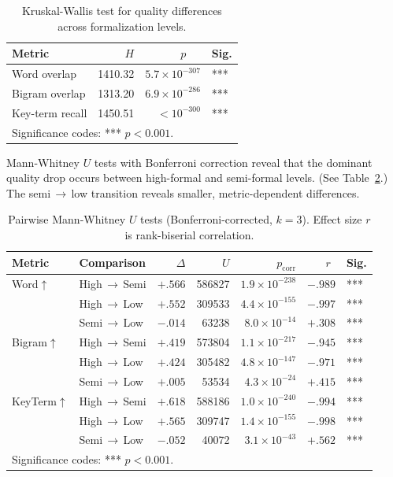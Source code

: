\documentclass[runningheads]{llncs}
\begin{document}
\begin{table}[htbp]
\centering
\caption{Kruskal-Wallis test for quality differences across formalization levels.}
\label{tab:kruskal}
\setlength{\tabcolsep}{5pt}
\begin{tabular}{lrrl}
\toprule
Metric & $H$ & $p~~~~~~$ & Sig. \\
\midrule
Word overlap    & 1410.32 & $5.7 \times 10^{-307}$ & *** \\
Bigram overlap  & 1313.20 & $6.9 \times 10^{-286}$ & *** \\
Key-term recall & 1450.51 & $< 10^{-300}$ & *** \\
\bottomrule
\multicolumn{4}{l}{\scriptsize Significance codes: *** $p < 0.001$.}
\end{tabular}
\end{table}

Mann-Whitney $U$ tests with Bonferroni correction reveal that the dominant quality drop occurs between high-formal and semi-formal levels. (See Table~\ref{tab:pairwise}.) The semi$\,\to\,$low transition reveals smaller, metric-dependent differences.

\begin{table}[htbp]
\centering
\caption{Pairwise Mann-Whitney $U$ tests (Bonferroni-corrected, $k\!=\!3$). Effect size $r$ is rank-biserial correlation.}
\label{tab:pairwise}
\setlength{\tabcolsep}{5pt}
\begin{tabular}{llrrrrl}
\toprule
Metric & Comparison & $\Delta$ & $U$ & $p_{\text{corr}}$ & $r~~$ & Sig. \\
\midrule
Word$\uparrow$
  & High$\,\to\,$Semi & $+.566$ & 586827 & $1.9 \times 10^{-238}$ & $-.989$ & *** \\
  & High$\,\to\,$Low  & $+.552$ & 309533 & $4.4 \times 10^{-155}$ & $-.997$ & *** \\
  & Semi$\,\to\,$Low  & $-.014$ & 63238 & $8.0 \times 10^{-14}$ & $+.308$ & *** \\
\midrule
Bigram$\uparrow$
  & High$\,\to\,$Semi & $+.419$ & 573804 & $1.1 \times 10^{-217}$ & $-.945$ & *** \\
  & High$\,\to\,$Low  & $+.424$ & 305482 & $4.8 \times 10^{-147}$ & $-.971$ & *** \\
  & Semi$\,\to\,$Low  & $+.005$ & 53534 & $4.3 \times 10^{-24}$ & $+.415$ & *** \\
\midrule
KeyTerm$\uparrow$
  & High$\,\to\,$Semi & $+.618$ & 588186 & $1.0 \times 10^{-240}$ & $-.994$ & *** \\
  & High$\,\to\,$Low  & $+.565$ & 309747 & $1.4 \times 10^{-155}$ & $-.998$ & *** \\
  & Semi$\,\to\,$Low  & $-.052$ & 40072 & $3.1 \times 10^{-43}$ & $+.562$ & *** \\
\bottomrule
\multicolumn{4}{l}{\scriptsize Significance codes: *** $p < 0.001$.}
\end{tabular}
\end{table}
\end{document}
